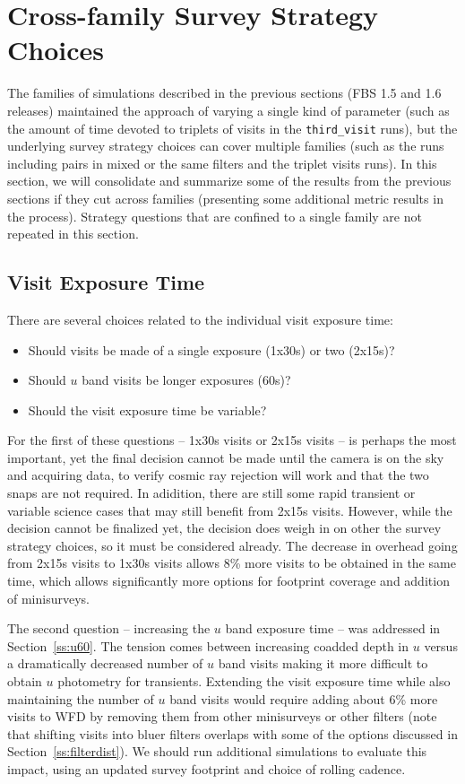\section{Cross-family Survey Strategy Choices}

The families of simulations described in the previous sections (FBS 1.5 and 1.6 releases) maintained the approach of varying a single kind of parameter (such as the amount of time devoted to triplets of visits in the {\tt third\_visit} runs), but the underlying survey strategy choices can cover multiple families (such as the runs including pairs in mixed or the same filters and the triplet visits runs). In this section, we will consolidate and summarize some of the results from the previous sections if they cut across families (presenting some additional metric results in the process). Strategy questions that are confined to a single family are not repeated in this section.

\subsection{Visit Exposure Time}\label{sec:visitexposuretime}

There are several choices related to the individual visit exposure time:
 \begin{itemize}
 \item Should visits be made of a single exposure (1x30s) or two (2x15s)? 
 \item Should $u$ band visits be longer exposures (60s)?
 \item Should the visit exposure time be variable?
 \end{itemize}
 
For the first of these questions -- 1x30s visits or 2x15s visits -- is perhaps the most important, yet the final decision cannot be made until the camera is on the sky and acquiring data, to verify cosmic ray rejection will work and that the two snaps are not required. In adidition, there are still some rapid transient or variable science cases that may still benefit from 2x15s visits. However, while the decision cannot be finalized yet, the decision does weigh in on other the survey strategy choices, so it must be considered already. The decrease in overhead going from 2x15s visits to 1x30s visits allows 8\% more visits to be obtained in the same time, which allows significantly more options for footprint coverage and addition of minisurveys. 

The second question -- increasing the $u$ band exposure time -- was addressed in Section~\ref{ss:u60}. The tension comes between increasing coadded depth in $u$ versus a dramatically decreased number of $u$ band visits making it more difficult to obtain $u$ photometry for transients. Extending the visit exposure time while also maintaining the number of $u$ band visits would require adding about 6\% more visits to WFD by removing them from other minisurveys or other filters (note that shifting visits into bluer filters overlaps with some of the options discussed in Section~\ref{ss:filterdist}). We should run additional simulations to evaluate this impact, using an updated survey footprint and choice of rolling cadence. 


